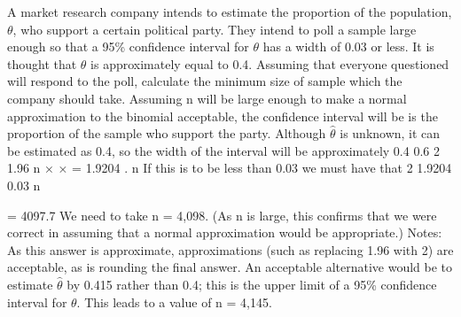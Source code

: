 \newpage

\item A market research company intends to estimate the proportion of the population, $\theta$, who support a certain political party. They intend to poll a sample large enough so that a 95\% confidence interval for $\theta$ has a width of 0.03 or less. It is thought that $\theta$ is approximately equal to 0.4.
Assuming that everyone questioned will respond to the poll, calculate the minimum size of sample which the company should take. 
 Assuming n will be large enough to make a normal approximation to the
binomial acceptable, the confidence interval will be
is the proportion of the sample who support the party.
Although $\hat{\theta}$ is unknown, it can be estimated as 0.4, so the width of the interval will be approximately
0.4 0.6
2 1.96
n
× × =
1.9204
.
n
If this is to be less than 0.03 we must have that
2 1.9204
0.03
n

= 4097.7
We need to take n = 4,098.
(As n is large, this confirms that we were correct in assuming that a normal
approximation would be appropriate.)
Notes: As this answer is approximate, approximations (such as replacing 1.96
with 2) are acceptable, as is rounding the final answer.
An acceptable alternative would be to estimate $\hat{\theta}$ by 0.415 rather than 0.4; this
is the upper limit of a 95\% confidence interval for $\theta$. This leads to a value of
n = 4,145.
